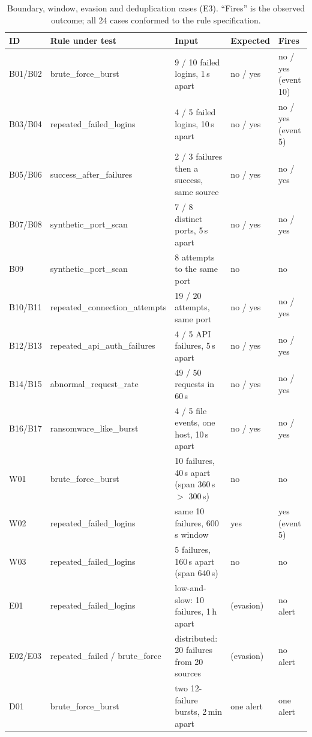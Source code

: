 \documentclass[conference]{IEEEtran}
\begin{document}
\begin{table}[t]
\caption{Boundary, window, evasion and deduplication cases (E3). ``Fires'' is the observed outcome; all 24 cases conformed to the rule specification.}
\label{tab:boundary}
\centering
\footnotesize
\begin{tabular}{@{}l l l l l@{}}
\toprule
ID & Rule under test & Input & Expected & Fires \\
\midrule
B01/B02 & brute\_force\_burst & 9 / 10 failed logins, 1\,s apart & no / yes & no / yes (event 10) \\
B03/B04 & repeated\_failed\_logins & 4 / 5 failed logins, 10\,s apart & no / yes & no / yes (event 5) \\
B05/B06 & success\_after\_failures & 2 / 3 failures then a success, same source & no / yes & no / yes \\
B07/B08 & synthetic\_port\_scan & 7 / 8 distinct ports, 5\,s apart & no / yes & no / yes \\
B09 & synthetic\_port\_scan & 8 attempts to the same port & no & no \\
B10/B11 & repeated\_connection\_attempts & 19 / 20 attempts, same port & no / yes & no / yes \\
B12/B13 & repeated\_api\_auth\_failures & 4 / 5 API failures, 5\,s apart & no / yes & no / yes \\
B14/B15 & abnormal\_request\_rate & 49 / 50 requests in 60\,s & no / yes & no / yes \\
B16/B17 & ransomware\_like\_burst & 4 / 5 file events, one host, 10\,s apart & no / yes & no / yes \\
W01 & brute\_force\_burst & 10 failures, 40\,s apart (span 360\,s $>$ 300\,s) & no & no \\
W02 & repeated\_failed\_logins & same 10 failures, 600\,s window & yes & yes (event 5) \\
W03 & repeated\_failed\_logins & 5 failures, 160\,s apart (span 640\,s) & no & no \\
E01 & repeated\_failed\_logins & low-and-slow: 10 failures, 1\,h apart & (evasion) & no alert \\
E02/E03 & repeated\_failed / brute\_force & distributed: 20 failures from 20 sources & (evasion) & no alert \\
D01 & brute\_force\_burst & two 12-failure bursts, 2\,min apart & one alert & one alert \\
\bottomrule
\end{tabular}
\end{table}
\end{document}
